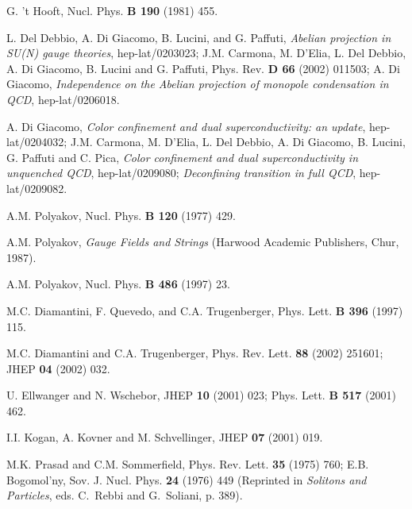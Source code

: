\documentclass[a4paper,12pt]{article}
\begin{document}
\begin{thebibliography}{99}

G. 't Hooft, Nucl. Phys. {\bf B 190} (1981) 455.

L. Del Debbio, A. Di Giacomo, B. Lucini, and G. Paffuti, {\it Abelian projection in SU(N) gauge theories},
hep-lat/0203023; J.M. Carmona, M. D'Elia, L. Del Debbio, A. Di Giacomo, B. Lucini and G. Paffuti,
Phys. Rev. {\bf D 66} (2002) 011503;
A. Di Giacomo, {\it Independence on the Abelian projection of monopole condensation in QCD}, hep-lat/0206018.

A. Di Giacomo, {\it Color confinement and dual
superconductivity: an update}, hep-lat/0204032;
J.M. Carmona, M. D'Elia, L. Del Debbio, A. Di Giacomo, B. Lucini, G. Paffuti and C. Pica,
{\it Color confinement and dual superconductivity in unquenched QCD},
hep-lat/0209080;
{\it Deconfining transition in full QCD},
hep-lat/0209082.

A.M. Polyakov, Nucl. Phys. {\bf B 120} (1977) 429.

A.M. Polyakov, {\it Gauge Fields and Strings} (Harwood Academic Publishers, Chur, 1987).

A.M. Polyakov, Nucl. Phys. {\bf B 486} (1997) 23.

M.C. Diamantini, F. Quevedo, and C.A. Trugenberger, Phys. Lett. {\bf B 396} (1997) 115.

M.C. Diamantini and C.A. Trugenberger, Phys. Rev. Lett. {\bf 88} (2002) 251601; JHEP {\bf 04} (2002) 032.

U. Ellwanger and N. Wschebor, JHEP {\bf 10} (2001) 023;
Phys. Lett. {\bf B 517} (2001) 462.

I.I. Kogan, A. Kovner and M. Schvellinger,
JHEP {\bf 07} (2001) 019.

M.K. Prasad and C.M. Sommerfield, Phys. Rev. Lett. {\bf 35} (1975) 760;
E.B. Bogomol'ny, Sov. J. Nucl. Phys. {\bf 24} (1976) 449
(Reprinted in {\it Solitons and Particles}, eds. C.~Rebbi and G.~Soliani, p. 389).


\end{thebibliography}
\end{document}
